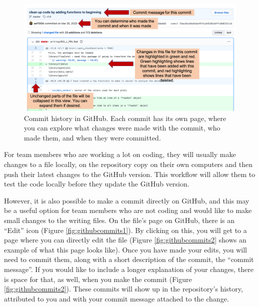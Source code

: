 \documentclass[]{tufte-book}
\begin{document}
\begin{figure}
\includegraphics[width=\textwidth]{figures/github_commit_history2} \caption[Commit history in GitHub]{Commit history in GitHub. Each commit has its own page, where you can explore what changes were made with the commit, who made them, and when they were committed.}\label{fig:githubcommithistory2}
\end{figure}

For team members who are working a lot on coding, they will usually make changes
to a file locally, on the repository copy on their own computers and then push
their latest changes to the GitHub version. This workflow will allow them to
test the code locally before they update the GitHub version.

However, it is also possible to make a commit directly on GitHub, and this may
be a useful option for team members who are not coding and would like to make
small changes to the writing files. On the file's page on GitHub, there is an
``Edit'' icon (Figure \ref{fig:githubcommits1}). By clicking on this, you will
get to a page where you can directly edit the file (Figure
\ref{fig:githubcommits2} shows an example of what this page looks like). Once
you have made your edits, you will need to commit them, along with a short
description of the commit, the ``commit message''. If you would like to include a
longer explanation of your changes, there is space for that, as well, when you
make the commit (Figure \ref{fig:githubcommits2}). These commits will show up
in the repository's history, attributed to you and with your commit message
attached to the change.
\end{document}
